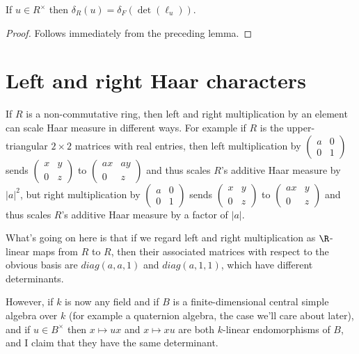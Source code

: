   \begin{corollary}
  \label{distribHaarChar_algebra}
  If $u\in R^\times$ then $\delta_R(u)=\delta_F(\det(\ell_u))$.
\end{corollary}
\begin{proof}
  Follows immediately from the preceding lemma.
\end{proof}

\section{Left and right Haar characters}

If $R$ is a non-commutative ring, then left and right multiplication by an element
can scale Haar measure in different ways.
For example if $R$ is the upper-triangular $2\times 2$ matrices with real
entries, then left multiplication by $\begin{pmatrix}a&0\\0&1\end{pmatrix}$
sends $\begin{pmatrix}x&y\\0&z\end{pmatrix}$ to $\begin{pmatrix}ax&ay\\0&z\end{pmatrix}$
and thus scales $R$'s additive
Haar measure by $|a|^2$, but right multiplication by $\begin{pmatrix}a&0\\0&1\end{pmatrix}$
sends $\begin{pmatrix}x&y\\0&z\end{pmatrix}$ to $\begin{pmatrix}ax&y\\0&z\end{pmatrix}$
and thus scales $R$'s additive Haar measure by a factor of $|a|$.

What's going on here is that if we regard left and right multiplication as $\R$-linear
maps from $R$ to $R$, then their associated matrices with respect to the obvious basis
are $diag(a,a,1)$ and $diag(a,1,1)$, which have different determinants.

However, if $k$ is now any field and if $B$ is a finite-dimensional central
simple algebra over $k$ (for example a quaternion algebra, the case we'll care about later),
and if $u\in B^\times$ then $x\mapsto ux$ and $x\mapsto xu$
are both $k$-linear endomorphisms of $B$, and I claim that they have
the same determinant.


